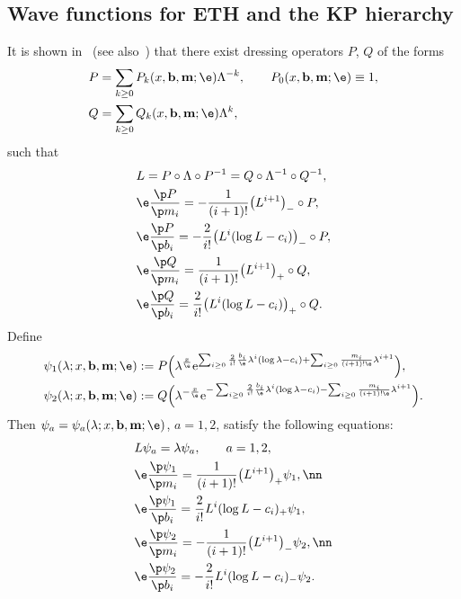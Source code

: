 \subsection{Wave functions for ETH and the KP hierarchy}
It is shown in~\cite{Carlet} (see also~\cite{CL, Milanov}) that there exist
dressing operators $P$, $Q$ of the forms
\begin{align}
&P= \sum_{k\ge0} P_k(x, {\bf b}, {\bf m};\e) \Lambda^{-k}, \qquad P_0(x, {\bf b}, {\bf m};\e)\equiv 1, \label{CoePk1005}\\
&Q= \sum_{k\ge0} Q_k(x, {\bf b}, {\bf m};\e) \Lambda^k, \label{CoeQk1005}
\end{align}
such that
\begin{align*}
& L=P\circ\Lambda\circ P^{-1}=Q\circ\Lambda^{-1}\circ Q^{-1}, \\
& \e\frac{\p P}{\p m_i} = - \frac1{(i+1)!} \bigl(L^{i+1}\bigr)_- \circ P, \\
& \e\frac{\p P}{\p b_i} = - \frac{2}{i!}\bigl(L^{i}(\log L-c_i)\bigr)_- \circ P,\\
& \e\frac{\p Q}{\p m_i} = \frac1{(i+1)!}\bigl(L^{i+1}\bigr)_+ \circ Q, \\
& \e\frac{\p Q}{\p b_i} = \frac{2}{i!}\bigl(L^{i}(\log L-c_i)\bigr)_+ \circ Q.
\end{align*}
Define
\begin{align*}
& \psi_1(\lambda; x, {\bf b}, {\bf m};\e) :=
P\Bigl(\lambda^{\frac{x}\e} {\rm e}^{\sum_{i\ge0} \frac{2}{i!} \frac{b_i}\e \lambda^i (\log \lambda-c_i)+\sum_{i\ge0} \frac{m_i}{(i+1)!\e} \lambda^{i+1}}\Bigr) , \\
& \psi_2(\lambda; x, {\bf b}, {\bf m};\e) := Q\Bigl(\lambda^{-\frac{x}\e}{\rm e}^{-\sum_{i\ge0} \frac{2}{i!} \frac{b_i}\e \lambda^i (\log \lambda-c_i)-\sum_{i\ge0} \frac{m_i}{(i+1)!\e} \lambda^{i+1}}\Bigr).
\end{align*}
Then $\psi_a=\psi_a(\lambda; x, {\bf b}, {\bf m};\e)$, $a=1,2$, satisfy the following equations:
\begin{align}
& L\psi_a = \lambda \psi_a, \qquad a=1,2, \label{Laxsp1005}\\
& \e \frac{\p \psi_1}{\p m_i} = \frac1{(i+1)!} \bigl(L^{i+1}\bigr)_+ \psi_1,\nn \\
& \e \frac{\p \psi_1}{\p b_i} = \frac{2}{i!} L^i(\log L - c_i)_+ \psi_1, \label{Laxa1bi} \\
& \e \frac{\p \psi_2}{\p m_i} = -\frac1{(i+1)!} \bigl(L^{i+1}\bigr)_- \psi_2,\nn \\
& \e \frac{\p \psi_2}{\p b_i} = -\frac{2}{i!} L^i(\log L - c_i)_- \psi_2. \label{Laxa2bi}
\end{align}
